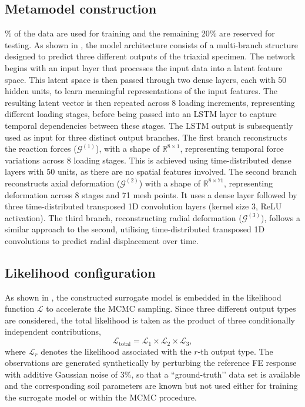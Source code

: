 \subsection{Metamodel construction}\% of the data are used for training and the remaining 20\% are reserved for testing. As shown in , the model architecture consists of a multi-branch structure designed to predict three different outputs of the triaxial specimen. The network begins with an input layer that processes the input data into a latent feature space. This latent space is then passed through two dense layers, each with 50 hidden units, to learn meaningful representations of the input features. The resulting latent vector is then repeated across 8 loading increments, representing different loading stages, before being passed into an LSTM layer to capture temporal dependencies between these stages. The LSTM output is subsequently used as input for three distinct output branches. The first branch reconstructs the reaction forces ($\mathcal{G}^{(1)}$), with a shape of $\mathbb{R}^{8 \times 1}$, representing temporal force variations across 8 loading stages. This is achieved using time-distributed dense layers with 50 units, as there are no spatial features involved. The second branch reconstructs axial deformation ($\mathcal{G}^{(2)}$) with a shape of $\mathbb{R}^{8 \times 71}$, representing deformation across 8 stages and 71 mesh points. It uses a dense layer followed by three time-distributed transposed 1D convolution layers (kernel size 3, ReLU activation). The third branch, reconstructing radial deformation ($\mathcal{G}^{(3)}$), follows a similar approach to the second, utilising time-distributed transposed 1D convolutions to predict radial displacement over time.

\subsection{Likelihood configuration}\label{Likelihood configuration}\noindent
As shown in , the constructed surrogate model is embedded in the likelihood function $\mathcal{L}$ to accelerate the MCMC sampling. Since three different output types are considered, the total likelihood is taken as the product of three conditionally independent contributions,
\begin{equation}
\mathcal{L}_{\text{total}} = \mathcal{L}_{1} \times \mathcal{L}_{2} \times \mathcal{L}_{3},
\end{equation}
where $\mathcal{L}_{r}$ denotes the likelihood associated with the $r$-th output type. The observations are generated synthetically by perturbing the reference FE response with additive Gaussian noise of 3\%, so that a “ground-truth’’ data set is available and the corresponding soil parameters are known but not used either for training the surrogate model or within the MCMC procedure.

